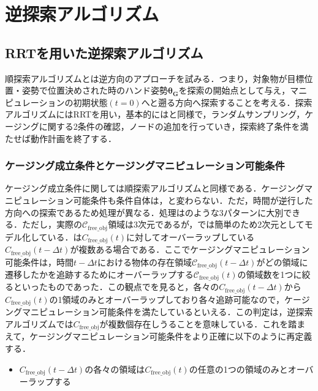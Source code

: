 \documentclass[a4paper,twoside,12pt,papersize, dvipdfmx]{iirthesis}
\begin{document}
{\section{逆探索アルゴリズム}\label{sec::planner::reverse}
\subsection{RRTを用いた逆探索アルゴリズム}
順探索アルゴリズムとは逆方向のアプローチを試みる．つまり，対象物が目標位置・姿勢で位置決めされた時のハンド姿勢$\bm{\theta_G}$を探索の開始点として与え，マニピュレーションの初期状態$(t=0)$へと遡る方向へ探索することを考える．探索アルゴリズムにはRRTを用い，基本的にはと同様で，ランダムサンプリング，ケージングに関する2条件の確認，ノードの追加を行っていき，探索終了条件を満たせば動作計画を終了する．

\subsubsection{ケージング成立条件とケージングマニピュレーション可能条件}\label{subsec::planner::revcm}
ケージング成立条件に関しては順探索アルゴリズムと同様である．ケージングマニピュレーション可能条件も条件自体は，と変わらない．ただ，時間が逆行した方向への探索であるため処理が異なる．処理はのような3パターンに大別できる．ただし，実際の$\mathcal{C}_{\mathrm{free\_obj}}$領域は3次元であるが，では簡単のため2次元としてモデル化している．は$C_{\mathrm{free\_obj}}(t)$に対してオーバーラップしている$C_{\mathrm{free\_obj}}(t-\Delta t)$が複数ある場合である．ここでケージングマニピュレーション可能条件は，時間$t-\Delta t$における物体の存在領域$\mathcal{C}_{\mathrm{free\_obj}}(t-\Delta t)$がどの領域に遷移したかを追跡するためにオーバーラップする$\mathcal{C}_{\mathrm{free\_obj}}(t)$の領域数を1つに絞るといったものであった．この観点でを見ると，各々の$C_{\mathrm{free\_obj}}(t-\Delta t)$から$C_{\mathrm{free\_obj}}(t)$の1領域のみとオーバーラップしており各々追跡可能なので，ケージングマニピュレーション可能条件を満たしているといえる．この判定は，逆探索アルゴリズムでは$C_{\mathrm{free\_obj}}$が複数個存在しうることを意味している．これを踏まえて，ケージングマニピュレーション可能条件をより正確に以下のように再定義する．
\begin{itemize}
\item $C_{\mathrm{free\_obj}}(t-\Delta t)$の各々の領域は$C_{\mathrm{free\_obj}}(t)$の任意の1つの領域のみとオーバーラップする
\end{itemize}

}
\end{document}
